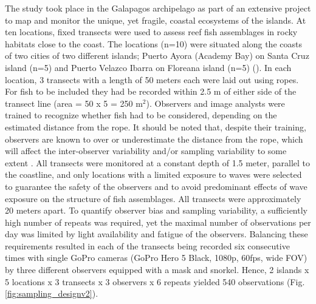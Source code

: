 \documentclass[10pt,letterpaper]{article}
\begin{document}
The study took place in the Galapagos archipelago as part of an extensive project to map and monitor the unique, yet fragile, coastal ecosystems of the islands. At ten locations, fixed transects were used to assess reef fish assemblages in rocky habitats close to the coast. The locations (n=10) were situated along the coasts of two cities of two different islands; Puerto Ayora (Academy Bay) on Santa Cruz island (n=5) and Puerto Velazco Ibarra on Floreana island (n=5) (). In each location, 3 transects with a length of 50 meters each were laid out using ropes. For fish to be included they had be recorded within 2.5 m of either side of the transect line (area = 50 x 5 = 250 m$^{2}$). Observers and image analysts were trained to recognize whether fish had to be considered, depending on the estimated distance from the rope. It should be noted that, despite their training, observers are known to over or underestimate the distance from the rope, which will affect the inter-observer variability and/or sampling variability to some extent \cite{Bernard2013,Harvey2004AAbundance}. All transects were monitored at a constant depth of 1.5 meter, parallel to the coastline, and only locations with a limited exposure to waves were selected to guarantee the safety of the observers and to avoid predominant effects of wave exposure on the structure of fish assemblages. All transects were approximately 20 meters apart. To quantify observer bias and sampling variability, a sufficiently high number of repeats was required, yet the maximal number of observations per day was limited by light availability and fatigue of the observers. Balancing these requirements resulted in each of the transects being recorded six consecutive times with single GoPro cameras (GoPro Hero 5 Black, 1080p, 60fps, wide FOV) by three different observers equipped with a mask and snorkel. Hence, 2 islands x 5 locations x 3 transects x 3 observers x 6 repeats yielded 540 observations (Fig. \ref{fig:sampling_designv2}). 
\end{document}

